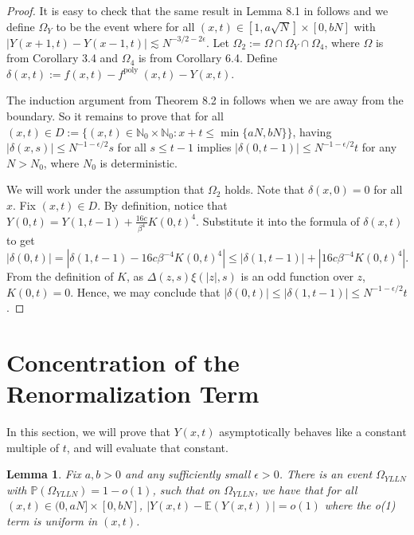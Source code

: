 \documentclass[10pt]{article}
\newtheorem{lemma}[theorem]{Lemma}
\begin{document}
\begin{proof}
It is easy to check that the same result in Lemma 8.1 in \cite{adhikari2022invariance} follows and we define $\Omega_Y$ to be the event where for all $(x,t) \in [1,a\sqrt{N}] \times [0, bN]$ with $|Y(x+1,t)-Y(x-1,t)| \lesssim N^{-3/2-2\epsilon}$.
Let $\Omega_{2}:=\Omega \cap \Omega_{Y} \cap \Omega_{4}$, where $\Omega$ is from Corollary 3.4 and $\Omega_{4}$ is from Corollary 6.4. Define $\delta(x, t):=f(x, t)-f^{\text {poly }}(x, t)-Y(x, t) .$

The induction argument from Theorem 8.2 in \cite{adhikari2022invariance} follows when we are away from the boundary. So it remains to prove that for all $(x, t)\in D:=\{(x,t) \in \mathbb{N}_0 \times \mathbb{N}_0: x+t \leq \min \{a N, b N\}\}$, having
$|\delta(x, s)| \leq N^{-1-\epsilon / 2} s$ for all $s \leq t-1$ implies $|\delta(0, t-1)| \leq N^{-1-\epsilon / 2} t$ for any $N>N_0$, where $N_0$ is deterministic.

We will work under the assumption that $\Omega_{2}$ holds. Note that $\delta(x, 0)=0$ for all $x$. Fix $(x, t) \in D$. By definition, notice that $Y(0,t)=Y(1,t-1)+\frac{16c}{\beta^4}K(0,t)^4$. Substitute it into the formula of $\delta(x,t)$ to get
\begin{equation}
    |\delta(0,t)|=|\delta(1,t-1)-16c\beta^{-4}K(0,t)^4| \leq |\delta(1,t-1)|+|16c\beta^{-4}K(0,t)^4|.
\end{equation}
From the definition of $K$, as $\Delta(z,s)\xi(|z|,s)$ is an odd function over $z$, $K(0,t)=0$. Hence, we may conclude that 
$|\delta(0,t)|\leq |\delta(1,t-1)| \leq N^{-1-\epsilon/2}t$.
    
\end{proof}









\section{Concentration of the Renormalization Term} \label{renorm}
In this section, we will prove that $Y(x, t)$ asymptotically behaves like a constant multiple of $t$, and will evaluate that constant.

\begin{lemma} \label{lem8.1}
    Fix $a, b>0$ and any sufficiently small $\epsilon>0$. There is an event $\Omega_{Y L L N}$ with $\mathbb{P}\left(\Omega_{Y L L N}\right)=1-o(1)$, such that on $\Omega_{Y L L N}$, we have that for all $(x, t) \in(0, a N] \times[0, b N]$, $|Y(x, t)-\mathbb{E}(Y(x, t))|=o(1)$ where the o(1) term is uniform in $(x, t)$.
\end{lemma} \label{8.1}
\end{document}
